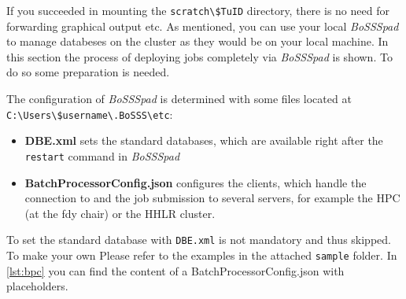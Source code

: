 \documentclass[11pt,twoside,a4paper]{fdyartcl}
\begin{document}
If you succeeded in mounting the \verb|scratch\$TuID| directory, there is no need for forwarding graphical output etc. As mentioned, you can use your local \emph{BoSSSpad} to manage databeses on the cluster as they would be on your local machine. In this section the process of deploying jobs completely via \emph{BoSSSpad} is shown. To do so some preparation is needed.

The configuration of \emph{BoSSSpad} is determined with some files located at \verb|C:\Users\$username\.BoSSS\etc|:
\begin{itemize}
	\item[] \textbf{DBE.xml} sets the standard databases, which are available right after the \verb|restart| command in \emph{BoSSSpad}
	\item[] \textbf{BatchProcessorConfig.json} configures the clients, which handle the connection to and the job submission to several servers, for example the HPC (at the fdy chair) or the HHLR cluster. 
\end{itemize}

To set the standard database with \verb|DBE.xml| is not mandatory and thus skipped.
To make your own Please refer to the examples in the attached \verb|sample| folder.
In \ref{lst:bpc} you can find the content of a BatchProcessorConfig.json with placeholders.
\end{document}

